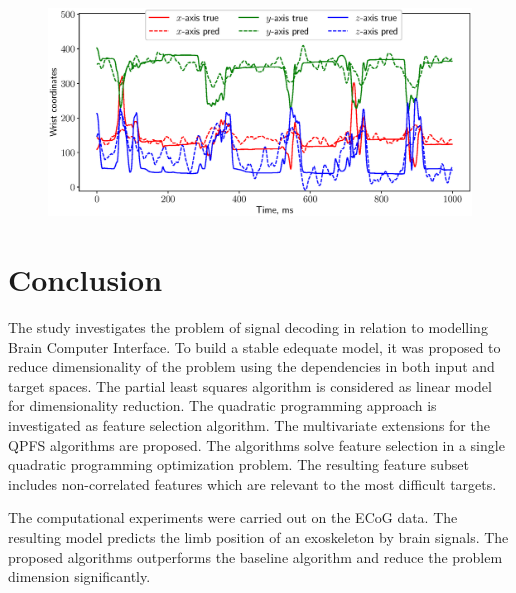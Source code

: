 \documentclass[12pt,oneside]{article}
\theoremstyle{definition}
\begin{document}
\begin{figure}
	\centering
	\includegraphics[width=\linewidth]{figs/ecog_prediction}
	\caption{}
	\label{fig:ecog_prediction}
\end{figure}

\newpage
\section{Conclusion}
The study investigates the problem of signal decoding in relation to modelling Brain Computer Interface. 
To build a stable edequate model, it was proposed to reduce dimensionality of the problem using the dependencies in both input and target spaces.
The partial least squares algorithm is considered as linear model for dimensionality reduction.
The quadratic programming approach is investigated as feature selection algorithm.
The multivariate extensions for the QPFS algorithms are proposed.
The algorithms solve feature selection in a single quadratic programming optimization problem.
The resulting feature subset includes non-correlated features which are relevant to the most difficult targets.

The computational experiments were carried out on the ECoG data. 
The resulting model predicts the limb position of an exoskeleton by brain signals.
The proposed algorithms outperforms the baseline algorithm and reduce the problem dimension significantly.


\newpage

\end{document}
